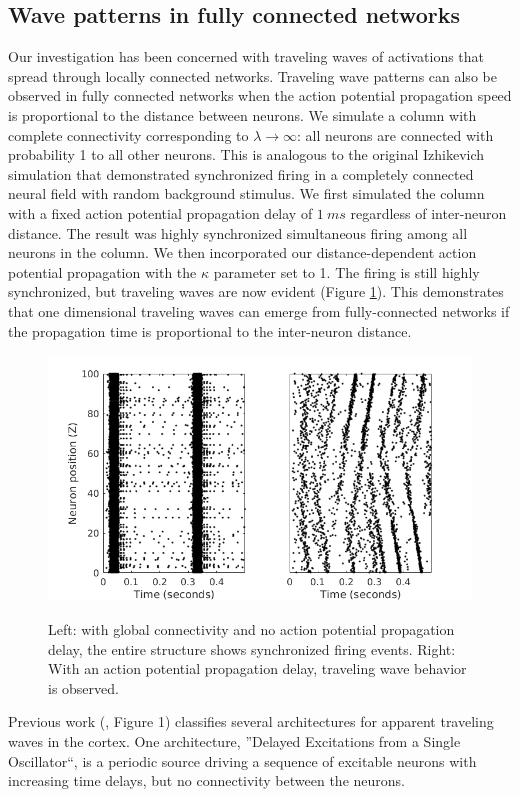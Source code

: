 \documentclass[a4paper,11pt]{article}
\begin{document}
\subsection{Wave patterns in fully connected networks} \label{sub:delay}
Our investigation has been concerned with traveling waves of activations that spread through locally connected networks.
Traveling wave patterns can also be observed in fully connected networks when the action potential propagation speed is proportional to the distance between neurons.
We simulate a column with complete connectivity corresponding to $\lambda \rightarrow \infty$: all neurons are connected with probability 1 to all other neurons.
This is analogous to the original Izhikevich simulation \cite{izzy_code} that demonstrated synchronized firing in a completely connected neural field with random background stimulus.
We first simulated the column with a fixed action potential propagation delay of $1~ms$ regardless of inter-neuron distance.
The result was highly synchronized simultaneous firing among all neurons in the column.
We then incorporated our distance-dependent action potential propagation with the $\kappa$ parameter set to 1.
The firing is still highly synchronized, but traveling waves are now evident (Figure \ref{fig:delay_waves}).
This demonstrates that one dimensional traveling waves can emerge from fully-connected networks if the propagation time is proportional to the inter-neuron distance.
\begin{figure}[!htb]
 \caption{Left: with global connectivity and no action potential propagation delay, the entire structure shows synchronized firing events. Right: With an action potential propagation delay, traveling wave behavior is observed.}
 \centering
   \includegraphics[width=\textwidth]{fig/DelayWaves}  
 \label{fig:delay_waves}
\end{figure}
Previous work (\cite{ermentrout2001}, Figure 1) classifies several architectures for apparent traveling waves in the cortex.
One architecture, ''Delayed Excitations from a Single Oscillator``, is a periodic source driving a sequence of excitable neurons with increasing time delays, but no connectivity between the neurons.
\end{document}
